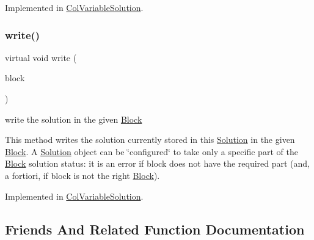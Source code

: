 Implemented in \mbox{\hyperlink{class_s_m_spp__di__unipi__it_1_1_col_variable_solution_abf263a2361d4099d9fe7fd4cddc7f7ec}{Col\+Variable\+Solution}}.

\mbox{\label{class_s_m_spp__di__unipi__it_1_1_solution_a6ba3f1b8f44f35e6a56fc0795587f68a}} 
\subsubsection{\texorpdfstring{write()}{write()}}
{\footnotesize\ttfamily virtual void write (\begin{DoxyParamCaption}\item[{\mbox{\hyperlink{class_s_m_spp__di__unipi__it_1_1_block}{Block}} $\ast$const}]{block }\end{DoxyParamCaption})\hspace{0.3cm}{\ttfamily [pure virtual]}}



write the solution in the given \mbox{\hyperlink{class_s_m_spp__di__unipi__it_1_1_block}{Block}} 

This method writes the solution currently stored in this \mbox{\hyperlink{class_s_m_spp__di__unipi__it_1_1_solution}{Solution}} in the given \mbox{\hyperlink{class_s_m_spp__di__unipi__it_1_1_block}{Block}}. A \mbox{\hyperlink{class_s_m_spp__di__unipi__it_1_1_solution}{Solution}} object can be \char`\"{}configured\char`\"{} to take only a specific part of the \mbox{\hyperlink{class_s_m_spp__di__unipi__it_1_1_block}{Block}} solution status\+: it is an error if block does not have the required part (and, a fortiori, if block is not the right \mbox{\hyperlink{class_s_m_spp__di__unipi__it_1_1_block}{Block}}). 

Implemented in \mbox{\hyperlink{class_s_m_spp__di__unipi__it_1_1_col_variable_solution_a99a9429b60ac714f7a4b5cbe4c0a96e4}{Col\+Variable\+Solution}}.



\subsection{Friends And Related Function Documentation}
\mbox{\label{class_s_m_spp__di__unipi__it_1_1_solution_a1963158e39c1643e92996ee932626aab}} 
